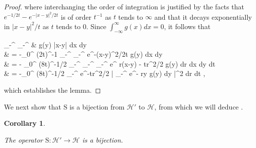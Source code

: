 \documentclass{amsart}
\numberwithin{equation}{section}
\newtheorem{cor}[thm]{Corollary}
\theoremstyle{remark}
\theoremstyle{definition}
\begin{document}
\begin{proof}
		\noindent where interchanging the order of integration is justified by the facts that $e^{-1/2t} - e^{-|x-y|^2/2t}$ is of order $t^{-1}$ as $t$ tends to $\infty$ and that it decays exponentially in $|x-y|^2/t$ as $t$ tends to $0$. Since $\int_{-\infty}^{\infty} g(x) dx = 0$, it follows that
		\begin{flalign*}
			\displaystyle\int_{-\infty}^{\infty} \displaystyle\int_{-\infty}^{\infty} &  g(y) \log |x-y| dx dy \\
			& = -\displaystyle\int_0^{\infty} (2t)^{-1} \displaystyle\int_{-\infty}^{\infty} \displaystyle\int_{-\infty}^{\infty} e^{-(x-y)^2/2t}  g(y) dx dy \\
			& = - \displaystyle\int_0^{\infty} (8t\pi)^{-1/2} \displaystyle\int_{-\infty}^{\infty} \displaystyle\int_{-\infty}^{\infty} \displaystyle\int_{-\infty}^{\infty} e^{ r(x-y) - tr^2/2}  g(y) dr dx dy dt \\
			& = -\displaystyle\int_0^{\infty} (8t\pi)^{-1/2} \displaystyle\int_{-\infty}^{\infty} e^{-tr^2/2} \Bigg| \displaystyle\int_{-\infty}^{\infty} e^{- ry} g(y) dy \Bigg|^2 dr dt ,
		\end{flalign*}
		
		\noindent which establishes the lemma. 
	\end{proof} 
	
	We next show that $\bm{\mathrm{S}}$ is a bijection from $\mathcal{H}'$ to $\mathcal{H}$, from which we will deduce .
	
	\begin{cor}
	
	\label{cs0}
	
	The operator $\bm{\mathrm{S}} : \mathcal{H}' \rightarrow \mathcal{H}$ is a bijection. 
	\end{cor} 
	
\end{document}
